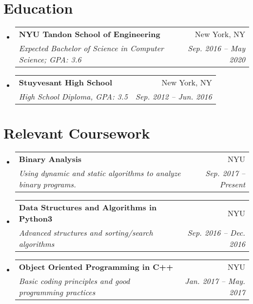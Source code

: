 \documentclass[letterpaper,10pt]{article}
\makeatletter
\newcommand{\resumeSubheading}[4]{
  \vspace{-3pt}\item
    \begin{tabular*}{0.97\textwidth}{l@{\extracolsep{\fill}}r}
      \textbf{#1} & #2 \\
      \textit{\small#3} & \textit{\small #4} \\
    \end{tabular*}\vspace{-5pt}
}
\newcommand{\resumeSubHeadingListStart}{\begin{itemize}[leftmargin=*]}
\newcommand{\resumeSubHeadingListEnd}{\end{itemize}}
\makeatother
\begin{document}
\section{Education}

\resumeSubHeadingListStart
  \resumeSubheading
    {NYU Tandon School of Engineering}{New York, NY}
    {Expected Bachelor of Science in Computer Science; GPA: 3.6}{Sep. 2016 -- May 2020}
  \resumeSubheading
    {Stuyvesant High School}{New York, NY}
    {High School Diploma, GPA: 3.5}{Sep. 2012 -- Jun. 2016}
\resumeSubHeadingListEnd

\section{Relevant Coursework}
  \resumeSubHeadingListStart
    \resumeSubheading
      {Binary Analysis}{NYU}
      {Using dynamic and static algorithms to analyze binary programs.}{Sep. 2017 -- Present}
    \resumeSubheading
      {Data Structures and Algorithms in Python3}{NYU}
      {Advanced structures and sorting/search algorithms}{Sep. 2016 -- Dec. 2016}
    \resumeSubheading
      {Object Oriented Programming in C++}{NYU}
      {Basic coding principles and good programming practices}{Jan. 2017 -- May. 2017}
  \resumeSubHeadingListEnd
\end{document}
